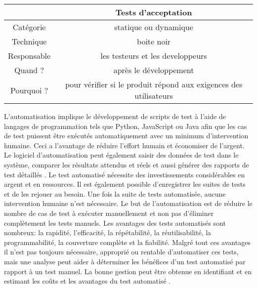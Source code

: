 \label{sec:criteres}
\begin{center}
    

\begin{tabular}{|c|c|}
    
    \hline
    \hline
    & Tests d'acceptation  \\ \hline
    Catégorie  & statique ou dynamique \\ \hline
    Technique & boite noir \\ \hline
    Responsable & les testeurs et les developpeurs \\ \hline
    Quand ? & après le développement \\ \hline
    Pourquoi ? & pour vérifier si le produit répond aux exigences des utilisateurs \\ \hline
    \hline
\end{tabular}
\end{center}
L'automatisation implique le développement de scripts de test à l'aide de langages de programmation tels que Python, JavaScript ou Java afin que les cas de test puissent être exécutés automatiquement avec un minimum d'intervention humaine. Ceci a l'avantage de réduire l'effort humain et économiser de l'argent. Le logiciel d'automatisation peut également saisir des données de test dans le système, comparer les résultats attendus et réels et aussi générer des rapports de test détaillés \parencite{automation}. Le test automatisé nécessite des investissements considérables en argent et en ressources. Il est également possible d'enregistrer les suites de tests et de les rejouer au besoin. Une fois la suite de tests automatisée, aucune intervention humaine n'est nécessaire. Le but de l'automatisation est de réduire le nombre de cas de test à exécuter manuellement et non pas d'éliminer complètement les tests manuels. 
Les avantages des tests automatisés sont nombreux: la rapidité, l'efficacité, la répétabilité, la réutilisabilité, la programmabilité, la couverture complète et la fiabilité. Malgré tout ces avantages il n'est pas toujours nécessaire, approprié ou rentable d'automatiser ces tests, mais une analyse peut aider à déterminer les bénéfices d'un test automatisé par rapport à un test manuel. La bonne gestion peut être obtenue en identifiant et en estimant les coûts et les avantages du test automatisé \parencite{automation2}.

